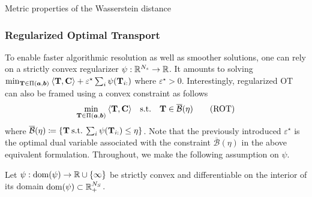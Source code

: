 \begin{mem1}{Metric properties of the Wasserstein distance}
    
\end{mem1}



\subsubsection{Regularized Optimal Transport}

To enable faster algorithmic resolution as well as smoother solutions, one can rely on a strictly convex regularizer $\psi : \mathbb{R}^{N_s} \to \mathbb{R}$. It amounts to solving $\min_{{\mathbf{T}} \in \Pi(\bm{a}, \bm{b})} \: \langle {\mathbf{T}}, \mathbf{C} \rangle + \varepsilon^\star \sum_i \psi({\mathbf{T}}_{i:})$ where $\varepsilon^\star > 0$. 
Interestingly, regularized OT can also be framed using a convex constraint as follows
\begin{align}\label{eq:cot}
    \min_{{\mathbf{T}} \in \Pi(\bm{a}, \bm{b})} \: \langle {\mathbf{T}}, {\mathbf{C}} \rangle \quad \text{s.t.} \quad  {\mathbf{T}} \in \overline{\mathcal{B}}(\eta)
    \tag{ROT}
\end{align}
where $\overline{\mathcal{B}}(\eta) \coloneqq \{ {\mathbf{T}} \: \text{s.t.} \: \sum_i \psi({\mathbf{T}}_{i:}) \leq \eta \}$. Note that the previously introduced $\varepsilon^\star$ is the optimal dual variable associated with the constraint $\overline{\mathcal{B}}(\eta)$ in the above equivalent formulation. 
Throughout, we make the following assumption on $\psi$.
\begin{assumption}\label{assumption_psi}
    Let $\psi: \mathrm{dom}(\psi) \to \mathbb{R} \cup \{\infty\}$ be strictly convex and differentiable on the interior of its domain $\mathrm{dom}(\psi) \subset \mathbb{R}^{N_S}_+$.
\end{assumption}


